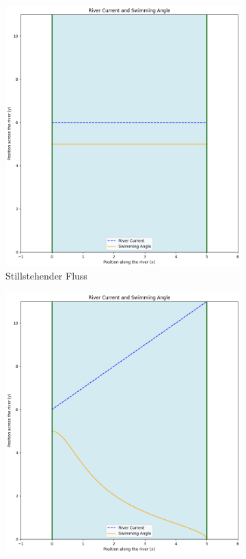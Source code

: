 \begin{figure}
    \centering
    \begin{subfigure}{0.48\textwidth}
        \centering
        \includegraphics[width=\textwidth]{Grafiken/strait-crop.png}	
        \caption{Stillstehender Fluss \newline}
        \label{fig:no_velocity}
    \end{subfigure}
    \hfill  
    \begin{subfigure}{0.48\textwidth}
        \centering
        \includegraphics[width=\textwidth]{Grafiken/diagoal-crop.png}	

\end{subfigure}
\end{figure}
